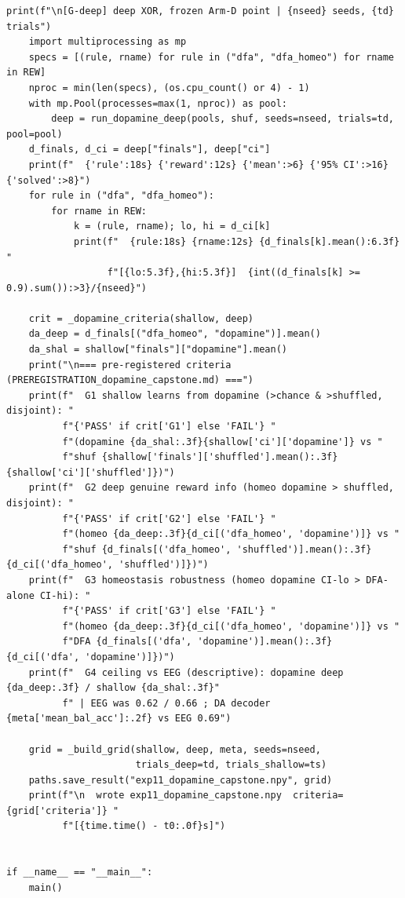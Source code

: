 \begin{lstlisting}[caption={mrl\_trace/dopamine.py},label={lst:siox-src-dopamine}]
    print(f"\n[G-deep] deep XOR, frozen Arm-D point | {nseed} seeds, {td} trials")
    import multiprocessing as mp
    specs = [(rule, rname) for rule in ("dfa", "dfa_homeo") for rname in REW]
    nproc = min(len(specs), (os.cpu_count() or 4) - 1)
    with mp.Pool(processes=max(1, nproc)) as pool:
        deep = run_dopamine_deep(pools, shuf, seeds=nseed, trials=td, pool=pool)
    d_finals, d_ci = deep["finals"], deep["ci"]
    print(f"  {'rule':18s} {'reward':12s} {'mean':>6} {'95% CI':>16} {'solved':>8}")
    for rule in ("dfa", "dfa_homeo"):
        for rname in REW:
            k = (rule, rname); lo, hi = d_ci[k]
            print(f"  {rule:18s} {rname:12s} {d_finals[k].mean():6.3f} "
                  f"[{lo:5.3f},{hi:5.3f}]  {int((d_finals[k] >= 0.9).sum()):>3}/{nseed}")

    crit = _dopamine_criteria(shallow, deep)
    da_deep = d_finals[("dfa_homeo", "dopamine")].mean()
    da_shal = shallow["finals"]["dopamine"].mean()
    print("\n=== pre-registered criteria (PREREGISTRATION_dopamine_capstone.md) ===")
    print(f"  G1 shallow learns from dopamine (>chance & >shuffled, disjoint): "
          f"{'PASS' if crit['G1'] else 'FAIL'} "
          f"(dopamine {da_shal:.3f}{shallow['ci']['dopamine']} vs "
          f"shuf {shallow['finals']['shuffled'].mean():.3f}{shallow['ci']['shuffled']})")
    print(f"  G2 deep genuine reward info (homeo dopamine > shuffled, disjoint): "
          f"{'PASS' if crit['G2'] else 'FAIL'} "
          f"(homeo {da_deep:.3f}{d_ci[('dfa_homeo', 'dopamine')]} vs "
          f"shuf {d_finals[('dfa_homeo', 'shuffled')].mean():.3f}{d_ci[('dfa_homeo', 'shuffled')]})")
    print(f"  G3 homeostasis robustness (homeo dopamine CI-lo > DFA-alone CI-hi): "
          f"{'PASS' if crit['G3'] else 'FAIL'} "
          f"(homeo {da_deep:.3f}{d_ci[('dfa_homeo', 'dopamine')]} vs "
          f"DFA {d_finals[('dfa', 'dopamine')].mean():.3f}{d_ci[('dfa', 'dopamine')]})")
    print(f"  G4 ceiling vs EEG (descriptive): dopamine deep {da_deep:.3f} / shallow {da_shal:.3f}"
          f" | EEG was 0.62 / 0.66 ; DA decoder {meta['mean_bal_acc']:.2f} vs EEG 0.69")

    grid = _build_grid(shallow, deep, meta, seeds=nseed,
                       trials_deep=td, trials_shallow=ts)
    paths.save_result("exp11_dopamine_capstone.npy", grid)
    print(f"\n  wrote exp11_dopamine_capstone.npy  criteria={grid['criteria']} "
          f"[{time.time() - t0:.0f}s]")


if __name__ == "__main__":
    main()
\end{lstlisting}

